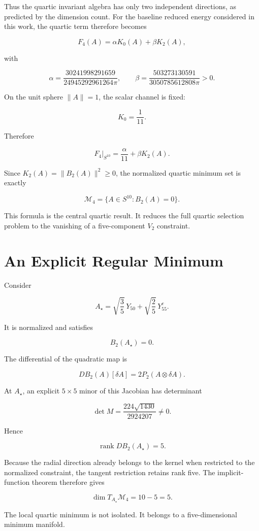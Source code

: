 Thus the quartic invariant algebra has only two independent directions, as predicted by the dimension count. For the baseline reduced energy considered in this work, the quartic term therefore becomes

\[
F_4(A)=\alpha K_0(A)+\beta K_2(A),
\]

with

\[
\alpha=\frac{30241998291659}{24945292961264\pi},
\qquad
\beta=\frac{503273130591}{3050785612808\pi}>0.
\]

On the unit sphere $\|A\|=1$, the scalar channel is fixed:

\[
K_0=\frac1{11}.
\]

Therefore

\[
F_4\big|_{S^{10}}=\frac{\alpha}{11}+\beta K_2(A).
\]

Since $K_2(A)=\|B_2(A)\|^2\ge0$, the normalized quartic minimum set is exactly

\[
\mathcal M_4=\{A\in S^{10}:B_2(A)=0\}.
\]

This formula is the central quartic result. It reduces the full quartic selection problem to the vanishing of a five-component $V_2$ constraint.

\section{An Explicit Regular Minimum}

Consider

\[
A_\star=\sqrt{\frac35}\,Y_{50}+\sqrt{\frac25}\,Y_{55}^{c}.
\]

It is normalized and satisfies

\[
B_2(A_\star)=0.
\]

The differential of the quadratic map is

\[
DB_2(A)[\delta A]=2P_2(A\otimes\delta A).
\]

At $A_\star$, an explicit $5\times5$ minor of this Jacobian has determinant

\[
\det M=\frac{224\sqrt{1430}}{2924207}\neq0.
\]

Hence

\[
\operatorname{rank}DB_2(A_\star)=5.
\]

Because the radial direction already belongs to the kernel when restricted to the normalized constraint, the tangent restriction retains rank five. The implicit-function theorem therefore gives

\[
\dim T_{A_\star}\mathcal M_4=10-5=5.
\]

The local quartic minimum is not isolated. It belongs to a five-dimensional minimum manifold.

